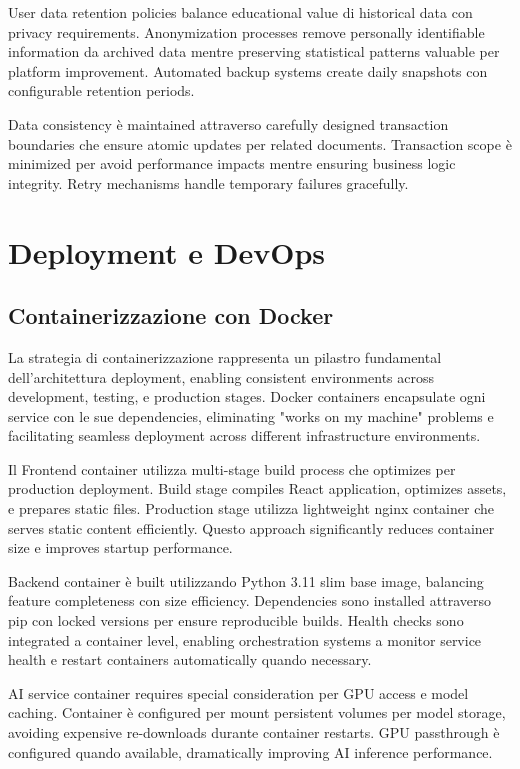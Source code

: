 \documentclass[12pt,a4paper]{article}
\begin{document}
User data retention policies balance educational value di historical data con privacy requirements. Anonymization processes remove personally identifiable information da archived data mentre preserving statistical patterns valuable per platform improvement. Automated backup systems create daily snapshots con configurable retention periods.

Data consistency è maintained attraverso carefully designed transaction boundaries che ensure atomic updates per related documents. Transaction scope è minimized per avoid performance impacts mentre ensuring business logic integrity. Retry mechanisms handle temporary failures gracefully.

\section{Deployment e DevOps}

\subsection{Containerizzazione con Docker}

La strategia di containerizzazione rappresenta un pilastro fundamental dell'architettura deployment, enabling consistent environments across development, testing, e production stages. Docker containers encapsulate ogni service con le sue dependencies, eliminating "works on my machine" problems e facilitating seamless deployment across different infrastructure environments.

Il Frontend container utilizza multi-stage build process che optimizes per production deployment. Build stage compiles React application, optimizes assets, e prepares static files. Production stage utilizza lightweight nginx container che serves static content efficiently. Questo approach significantly reduces container size e improves startup performance.

Backend container è built utilizzando Python 3.11 slim base image, balancing feature completeness con size efficiency. Dependencies sono installed attraverso pip con locked versions per ensure reproducible builds. Health checks sono integrated a container level, enabling orchestration systems a monitor service health e restart containers automatically quando necessary.

AI service container requires special consideration per GPU access e model caching. Container è configured per mount persistent volumes per model storage, avoiding expensive re-downloads durante container restarts. GPU passthrough è configured quando available, dramatically improving AI inference performance.
\end{document}
